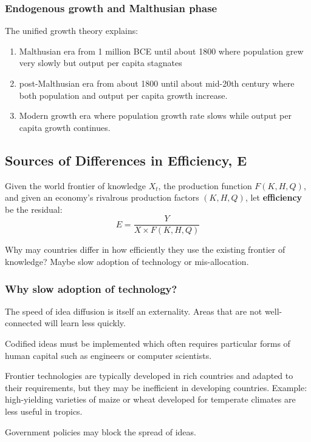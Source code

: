 \documentclass[11pt]{article}
\begin{document}
\subsubsection{Endogenous growth and Malthusian phase}

The unified growth theory explains:
\begin{enumerate}
    \item Malthusian era from 1 million BCE until about 1800 where population grew very slowly but output per capita stagnates
    \item post-Malthusian era from about 1800 until about mid-20th century where both population and output per capita growth increase.
    \item Modern growth era where population growth rate slows while output per capita growth continues.
\end{enumerate}

\subsection{Sources of Differences in Efficiency, E}

Given the world frontier of knowledge $X_t$, the production function $F(K,H,Q)$, and given an economy's rivalrous production factors $(K,H,Q)$, let \textbf{efficiency} be the residual:
\[E = \dfrac{Y}{X\times F(K,H,Q)}\]

Why may countries differ in how efficiently they use the existing frontier of knowledge? Maybe slow adoption of technology or mis-allocation.

\subsubsection{Why slow adoption of technology?}

The speed of idea diffusion is itself an externality. Areas that are not well-connected will learn less quickly.

Codified ideas must be implemented which often requires particular forms of human capital such as engineers or computer scientists.

Frontier technologies are typically developed in rich countries and adapted to their requirements, but they may be inefficient in developing countries. Example: high-yielding varieties of maize or wheat developed for temperate climates are less useful in tropics.

Government policies may block the spread of ideas.
\end{document}
